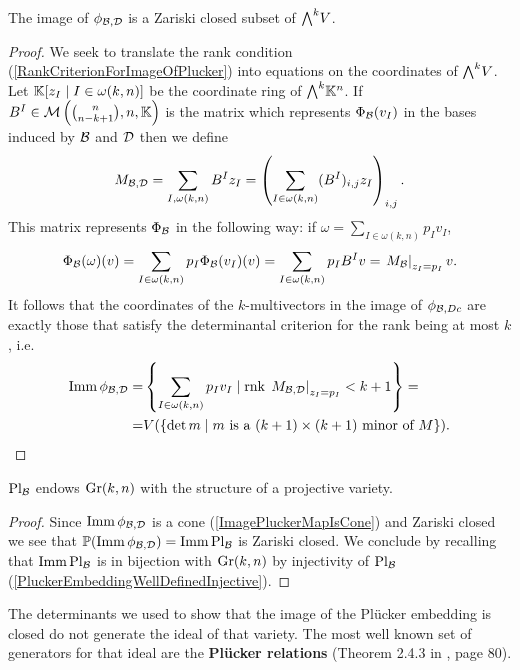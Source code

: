 \begin{theorem}\label{ImageOfPhiClosed}
The image of $\phi_{\mathcal{B},\mathcal{D}}$ is a Zariski closed subset of $\bw V$.
\end{theorem}
\begin{proof}
We seek to translate the rank condition (\ref{RankCriterionForImageOfPlucker}) into equations on the coordinates of $\bw V$. Let $\mathbb{K}[z_I\mid I\in\omega(k,n)]$ be the coordinate ring of $\bw \K^n$. If $B^I\in \mathcal{M}\left({\binom{n}{n-k+1},n,\mathbb{K}}\right)$ is the matrix which represents $\Phi_{\mathcal{B}}(v_I)$ in the bases induced by $\mathcal{B}$ and $\mathcal{D}$ then we define
\[M_{\mathcal{B},\mathcal{D}}=\sum_{I,\omega(k,n)}B^I z_I=\left({\sum_{I\in\omega(k,n)}(B^I)_{i,j}z_I}\right)_{i,j}.\]
This matrix represents $\Phi_{\mathcal{B}}$ in the following way: if $\omega=\sum_{I\in\omega(k,n)}p_I v_I$,
\[\Phi_{\mathcal{B}}(\omega)(v)=\sum_{I\in \omega(k,n)}p_I \Phi_{\mathcal{B}}(v_I)(v)=\sum_{I\in \omega(k,n)}p_I B^I v=\left.{M_{\mathcal{B}}}\right|_{z_I=p_I}v.\]
It follows that the coordinates of the $k$-multivectors in the image of $\phi_{\mathcal{B},Dc}$ are exactly those that satisfy the determinantal criterion for the rank being at most $k$, i.e.
\begin{align*}
\mathrm{Imm}\, \phi_{\mathcal{B},\mathcal{D}}=&\left\{{\sum_{I\in \omega(k,n)}p_I v_I\mid \mathrm{rnk}\, \left.{M_{\mathcal{B},\mathcal{D}}}\right|_{z_I=p_I}<k+1}\right\}=\\
=&V(\left\{{\det m\mid \text{$m$ is a $(k+1)\times (k+1)$ minor of $M$}}\right\}).
\end{align*}
\end{proof}
\begin{corollary}\label{ImageOfPluckerEmbeddingIsClosed}
$\mathrm{Pl}_{\mathcal{B}}$ endows $\mathrm{Gr}(k,n)$ with the structure of a projective variety.
\end{corollary}
\begin{proof}
Since $\mathrm{Imm}\,\phi_{\mathcal{B},\mathcal{D}}$ is a cone (\ref{ImagePluckerMapIsCone}) and Zariski closed we see that $\mathbb{P}(\mathrm{Imm}\, \phi_{\mathcal{B},\mathcal{D}})=\mathrm{Imm}\, \mathrm{Pl}_{\mathcal{B}}$ is Zariski closed.
We conclude by recalling that $\mathrm{Imm}\,\mathrm{Pl}_{\mathcal{B}}$ is in bijection with $\mathrm{Gr}(k,n)$ by injectivity of $\mathrm{Pl}_{\mathcal{B}}$ (\ref{PluckerEmbeddingWellDefinedInjective}).
\end{proof}

\begin{remark}
The determinants we used to show that the image of the Pl\"ucker embedding is closed do not generate the ideal of that variety. The most well known set of generators for that ideal are the \textbf{Pl\"ucker relations} (Theorem 2.4.3 in \cite{matroids}, page 80).
\end{remark}




